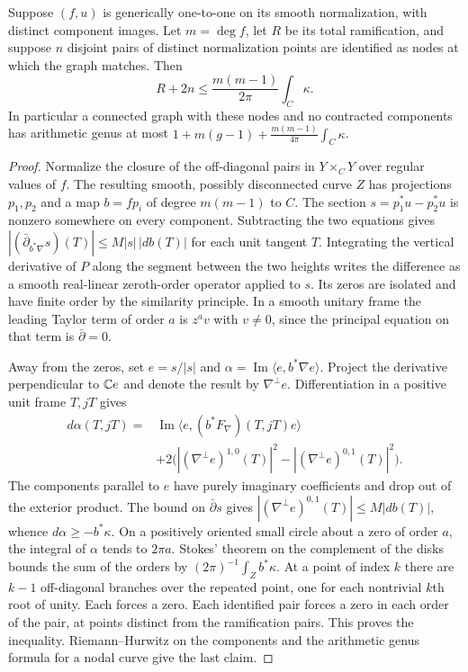 \begin{lemma}\label{p10-lem:curvature}
Suppose $(f,u)$ is generically one-to-one on its smooth
normalization, with distinct component images. Let $m=\deg f$,
let $R$ be its total ramification, and suppose $n$ disjoint pairs
of distinct normalization points are identified as nodes at which
the graph matches. Then
\[
 R+2n\le \frac{m(m-1)}{2\pi}\int_C\kappa .
\]
In particular a connected graph with these nodes and no contracted
components has arithmetic genus at most
$1+m(g-1)+\frac{m(m-1)}{4\pi}\int_C\kappa$.
\end{lemma}
\begin{proof}
Normalize the closure of the off-diagonal pairs in $Y\times_C Y$ over
regular values of $f$. The resulting smooth, possibly disconnected
curve $Z$ has projections $p_1,p_2$ and a map $b=fp_i$ of degree
$m(m-1)$ to $C$. The section $s=p_1^*u-p_2^*u$ is nonzero somewhere on
every component. Subtracting the two equations gives
$|(\bar\partial_{b^*\nabla}s)(T)|\le M|s|\,|db(T)|$ for each unit
tangent $T$. Integrating the vertical derivative of $P$ along
the segment between the two heights writes the difference as a
smooth real-linear zeroth-order operator applied to $s$. Its zeros
are isolated and have finite order by the similarity principle.
In a smooth unitary frame the leading Taylor term of order $a$ is
$z^a v$ with $v\ne0$, since the principal equation on that term is
$\bar\partial=0$.

Away from the zeros, set $e=s/|s|$ and
$\alpha=\operatorname{Im}\langle e,b^*\nabla e\rangle$.
Project the derivative perpendicular to $\mathbb C e$ and denote the
result by $\nabla^\perp e$. Differentiation in a positive unit
frame $T,jT$ gives
\begin{align*}
 d\alpha(T,jT)={}&\operatorname{Im}
   \langle e,(b^*F_\nabla)(T,jT)e\rangle \\
  &+2\bigl(|(\nabla^\perp e)^{1,0}(T)|^2-
                            |(\nabla^\perp e)^{0,1}(T)|^2\bigr).
\end{align*}
The components parallel to $e$ have purely imaginary coefficients and
drop out of the exterior product. The bound on $\bar\partial s$ gives
$|(\nabla^\perp e)^{0,1}(T)|\le M|db(T)|$, whence
$d\alpha\ge-b^*\kappa$. On a positively oriented small circle about
a zero of order $a$, the integral of $\alpha$ tends to $2\pi a$.
Stokes' theorem on the complement of the disks bounds the sum of the
orders by $(2\pi)^{-1}\int_Z b^*\kappa$.
At a point of index $k$ there are $k-1$ off-diagonal branches over
the repeated point, one for each nontrivial $k$th root of unity.
Each forces a zero. Each identified pair forces a zero in each
order of the pair, at points distinct from the ramification pairs.
This proves the inequality. Riemann--Hurwitz on the components
and the arithmetic genus formula for a nodal curve give the last claim.
\end{proof}

